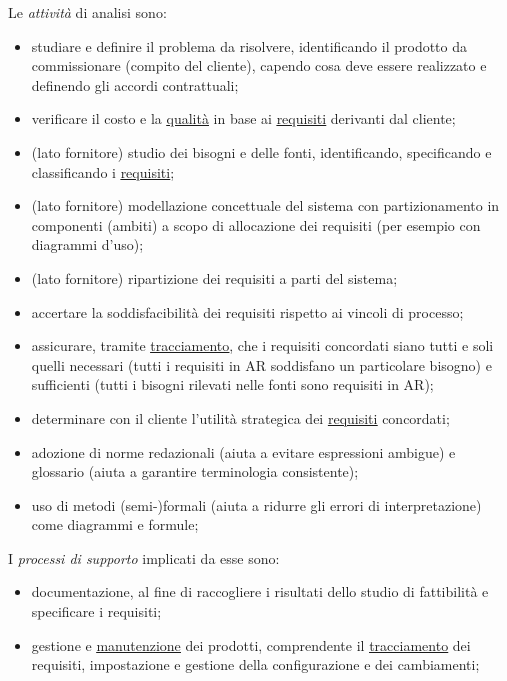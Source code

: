		Le \textit{attività} di analisi sono:
			\begin{itemize}
				\item studiare e definire il problema da risolvere, identificando il prodotto da commissionare (compito del cliente), capendo cosa deve essere realizzato e definendo gli accordi contrattuali;
				\item verificare il costo e la \underline{\hyperref[qualita]{qualità}} in base ai \underline{\hyperref[requirements]{requisiti}} derivanti dal cliente;
				\item (lato fornitore) studio dei bisogni e delle fonti, identificando, specificando e classificando i \underline{\hyperref[requirements]{requisiti}};
				\item (lato fornitore) modellazione concettuale del sistema con partizionamento in componenti (ambiti) a scopo di	allocazione dei requisiti (per esempio con diagrammi d'uso);
				\item (lato fornitore) ripartizione dei requisiti a parti del sistema;
				\item accertare la soddisfacibilità dei requisiti rispetto ai
				vincoli di processo;
				\item assicurare, tramite \underline{\hyperref[tracciamento]{tracciamento}}, che i requisiti concordati siano tutti e soli quelli necessari (tutti i requisiti in AR	soddisfano un particolare bisogno) e sufficienti (tutti i bisogni rilevati nelle fonti sono requisiti in AR);
				\item determinare con il cliente l’utilità strategica dei
				\underline{\hyperref[requirements]{requisiti}} concordati;
				\item adozione di norme redazionali (aiuta a evitare espressioni ambigue) e glossario (aiuta a garantire terminologia consistente);
				\item uso di metodi (semi-)formali (aiuta a ridurre
				gli errori di interpretazione) come diagrammi e formule;
			\end{itemize}
		
		I \textit{processi di supporto} implicati da esse sono:
			\begin{itemize}
				\item documentazione, al fine di raccogliere i risultati dello studio di fattibilità e specificare i requisiti;
				\item gestione e \underline{\hyperref[manutenzione]{manutenzione}} dei prodotti, comprendente il \underline{\hyperref[tracciamento]{tracciamento}} dei requisiti, impostazione e gestione della configurazione e dei cambiamenti;
			\end{itemize}
		
